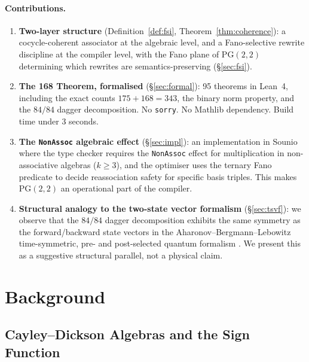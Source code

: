 \documentclass[11pt,a4paper]{article}
\theoremstyle{definition}
\theoremstyle{remark}
\newcommand{\PG}{\mathrm{PG}}
\begin{document}
\paragraph{Contributions.}
\begin{enumerate}
\item \textbf{Two-layer structure} (Definition~\ref{def:fsi},
  Theorem~\ref{thm:coherence}): a cocycle-coherent associator
  at the algebraic level, and a Fano-selective rewrite discipline
  at the compiler level, with the Fano plane of $\PG(2,2)$
  determining which rewrites are semantics-preserving
  (\S\ref{sec:fsi}).

\item \textbf{The 168 Theorem, formalised} (\S\ref{sec:formal}):
  95 theorems in Lean~4, including the exact counts $175 + 168 = 343$,
  the binary norm property, and the $84/84$ dagger decomposition.
  No \texttt{sorry}. No Mathlib dependency. Build time under 3 seconds.

\item \textbf{The \texttt{NonAssoc} algebraic effect} (\S\ref{sec:impl}):
  an implementation in Sounio where the type checker requires the
  \texttt{NonAssoc} effect for multiplication in non-associative
  algebras ($k \geq 3$), and the optimiser uses the ternary Fano
  predicate to decide reassociation safety for specific basis triples.
  This makes $\PG(2,2)$ an operational part of the compiler.

\item \textbf{Structural analogy to the two-state vector formalism}
  (\S\ref{sec:tsvf}): we observe that the $84/84$ dagger decomposition
  exhibits the same symmetry as the forward/backward state vectors
  in the Aharonov--Bergmann--Lebowitz time-symmetric, pre- and
  post-selected quantum formalism \cite{abl1964}. We present this as
  a suggestive structural parallel, not a physical claim.
\end{enumerate}

\section{Background}\label{sec:background}

\subsection{Cayley--Dickson Algebras and the Sign Function}
\end{document}
